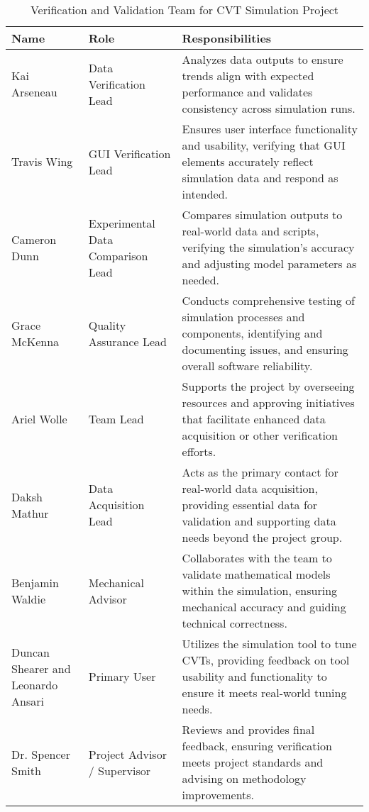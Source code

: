 \documentclass[12pt, titlepage]{article}
\begin{document}
\begin{table}[h!]
  \centering
  \begin{tabular}{|p{3cm}|p{3cm}|p{10cm}|}
  \hline
  \textbf{Name} & \textbf{Role} & \textbf{Responsibilities} \\
  \hline
  Kai Arseneau & Data Verification Lead & Analyzes data outputs to ensure trends align with expected performance and validates consistency across simulation runs. \\
  \hline
  Travis Wing & GUI Verification Lead & Ensures user interface functionality and usability, verifying that GUI elements accurately reflect simulation data and respond as intended. \\
  \hline
  Cameron Dunn & Experimental Data Comparison Lead & Compares simulation outputs to real-world data and scripts, verifying the simulation's accuracy and adjusting model parameters as needed. \\
  \hline
  Grace McKenna & Quality Assurance Lead & Conducts comprehensive testing of simulation processes and components, identifying and documenting issues, and ensuring overall software reliability. \\
  \hline
  Ariel Wolle & Team Lead & Supports the project by overseeing resources and approving initiatives that facilitate enhanced data acquisition or other verification efforts. \\
  \hline
  Daksh Mathur &  Data Acquisition Lead & Acts as the primary contact for real-world data acquisition, providing essential data for validation and supporting data needs beyond the project group. \\
  \hline
  Benjamin Waldie & Mechanical Advisor & Collaborates with the team to validate mathematical models within the simulation, ensuring mechanical accuracy and guiding technical correctness. \\
  \hline
  Duncan Shearer and Leonardo Ansari & Primary User & Utilizes the simulation tool to tune CVTs, providing feedback on tool usability and functionality to ensure it meets real-world tuning needs. \\
  \hline
  Dr. Spencer Smith & Project Advisor / Supervisor & Reviews and provides final feedback, ensuring verification meets project standards and advising on methodology improvements. \\
  \hline
  \end{tabular}
  \caption{Verification and Validation Team for CVT Simulation Project}
  \label{tab:vnv_team}
\end{table}
\restoregeometry
    
\end{document}
